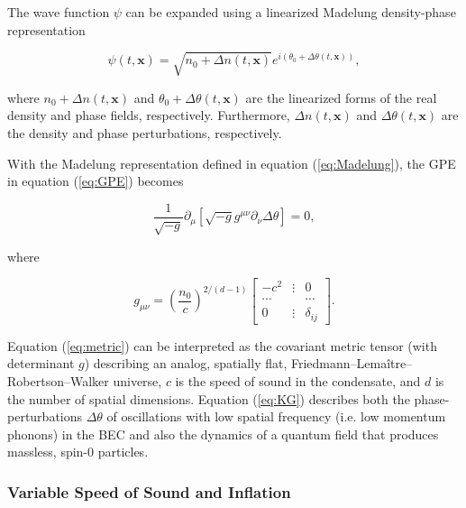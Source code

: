 \documentclass{article}
\begin{document}
            The wave function $\psi$ can be expanded using a linearized Madelung density-phase representation

            \begin{equation} \label{eq:Madelung}
                \psi(t, \mathbf{x}) = \sqrt{n_0 + \Delta n(t, \mathbf{x})} e^{i \left( \theta_0 + \Delta\theta(t, \mathbf{x}) \right)},
            \end{equation}

            where $n_0 + \Delta n(t, \mathbf{x})$ and $\theta_0 + \Delta \theta(t, \mathbf{x})$ are the linearized forms of the real density and phase fields, respectively.  Furthermore, $\Delta n(t, \mathbf{x})$ and $\Delta \theta(t, \mathbf{x})$ are the density and phase perturbations, respectively.
            
            With the Madelung representation defined in equation (\ref{eq:Madelung}), the GPE in equation (\ref{eq:GPE}) becomes\cite{Jain} 

            \begin{equation} \label{eq:KG}
                \frac{1}{\sqrt{-g}} \partial_\mu \left[ \sqrt{-g} g^{\mu \nu} \partial_\nu \Delta\theta \right] = 0,
            \end{equation}

            where 

            \begin{equation} \label{eq:metric}
                g_{\mu \nu} = \left( \frac{n_0}{c} \right)^{2 / (d - 1)} \begin{bmatrix}
                    -c^2 & \vdots & 0 \\
                    \cdots & & \cdots \\
                    0 & \vdots & \delta_{ij}
                \end{bmatrix}.
            \end{equation}

            Equation (\ref{eq:metric}) can be interpreted as the covariant metric tensor (with determinant $g$) describing an analog, spatially flat, Friedmann–Lema{\^i}tre–Robertson–Walker universe, $c$ is the speed of sound in the condensate, and $d$ is the number of spatial dimensions.  Equation (\ref{eq:KG}) describes both the phase-perturbations $\Delta\theta$ of oscillations with low spatial frequency (i.e. low momentum phonons) in the BEC and also the dynamics of a quantum field that produces massless, spin-0 particles.

        \subsubsection{Variable Speed of Sound and Inflation}
\end{document}
